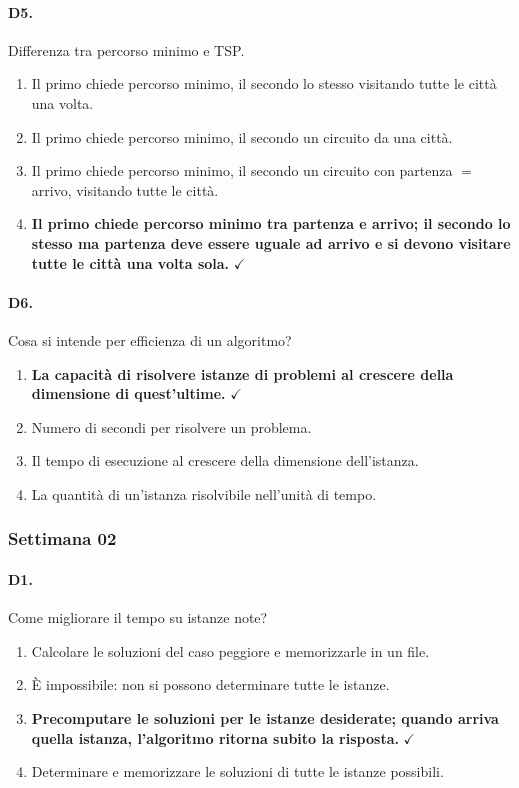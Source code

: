 \paragraph{D5.} Differenza tra percorso minimo e TSP.
\begin{enumerate}[label=\Alph*.,leftmargin=*]
	\item Il primo chiede percorso minimo, il secondo lo stesso visitando tutte le citt\`a una volta.
	\item Il primo chiede percorso minimo, il secondo un circuito da una citt\`a.
	\item Il primo chiede percorso minimo, il secondo un circuito con partenza $=$ arrivo, visitando tutte le citt\`a.
	\item \textcolor{correctgreen}{\textbf{Il primo chiede percorso minimo tra partenza e arrivo; il secondo lo stesso ma partenza deve essere uguale ad arrivo e si devono visitare tutte le citt\`a una volta sola.}} \hfill\textcolor{correctgreen}{$\checkmark$}
\end{enumerate}

\paragraph{D6.} Cosa si intende per efficienza di un algoritmo?
\begin{enumerate}[label=\Alph*.,leftmargin=*]
	\item \textcolor{correctgreen}{\textbf{La capacit\`a di risolvere istanze di problemi al crescere della dimensione di quest'ultime.}} \hfill\textcolor{correctgreen}{$\checkmark$}
	\item Numero di secondi per risolvere un problema.
	\item Il tempo di esecuzione al crescere della dimensione dell'istanza.
	\item La quantit\`a di un'istanza risolvibile nell'unit\`a di tempo.
\end{enumerate}

\subsubsection{Settimana 02}

\paragraph{D1.} Come migliorare il tempo su istanze note?
\begin{enumerate}[label=\Alph*.,leftmargin=*]
	\item Calcolare le soluzioni del caso peggiore e memorizzarle in un file.
	\item \`E impossibile: non si possono determinare tutte le istanze.
	\item \textcolor{correctgreen}{\textbf{Precomputare le soluzioni per le istanze desiderate; quando arriva quella istanza, l'algoritmo ritorna subito la risposta.}} \hfill\textcolor{correctgreen}{$\checkmark$}
	\item Determinare e memorizzare le soluzioni di tutte le istanze possibili.
\end{enumerate}

